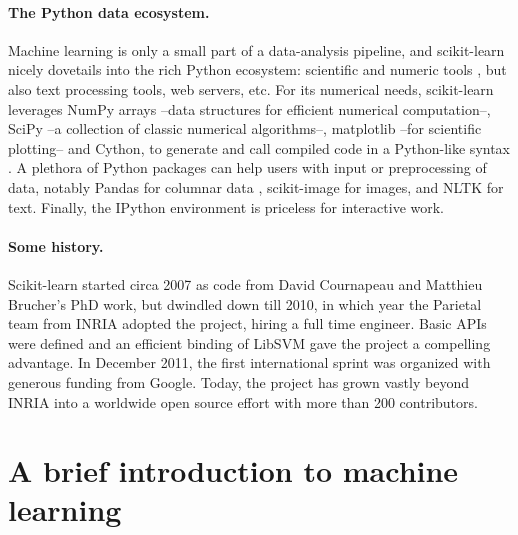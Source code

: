 \documentclass[a4paper]{article}
\begin{document}
\paragraph{The Python data ecosystem.}
%
Machine learning is only a small part of a data-analysis pipeline, and
scikit-learn nicely dovetails into the rich Python ecosystem: scientific
and numeric tools \cite{oliphant2007python,varoquaux2013scipy}, but also
text processing tools, web servers, etc.
%
For its numerical needs, scikit-learn leverages NumPy arrays
\cite{vanderwalt2011} --data structures for efficient numerical
computation--, SciPy --a collection of classic numerical algorithms--,
matplotlib \cite{hunter2007matplotlib} --for scientific plotting-- and
Cython, to generate and call compiled code in a Python-like syntax
\cite{behnel2011cython}.
%
A plethora of Python packages can help users with input or preprocessing
of data, notably Pandas for columnar data \cite{mckinney2012}, scikit-image
for images, and NLTK for text. Finally, the IPython environment
\cite{perez2007ipython} is priceless for interactive work.

\paragraph{Some history.}
%
Scikit-learn started circa 2007 as code from David Cournapeau and
Matthieu Brucher's PhD work, but dwindled down till 2010, in which year the
Parietal team from INRIA adopted the project, hiring a full time
engineer. Basic APIs were defined and an efficient binding of LibSVM
\cite{chang2011libsvm} gave the project a compelling advantage. In
December 2011, the first international sprint was organized with generous
funding from Google. Today, the project has grown vastly beyond
INRIA into a worldwide open source effort with more than 200 contributors.

\section{A brief introduction to machine learning}
\end{document}
